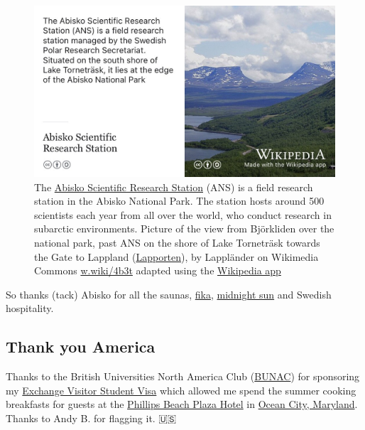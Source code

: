 \documentclass[
]{book}
\begin{document}
\begin{figure}

{\centering \includegraphics[width=0.99\linewidth]{images/abisko} 

}

\caption{The \href{https://en.wikipedia.org/wiki/Abisko_Scientific_Research_Station}{Abisko Scientific Research Station} (ANS) is a field research station in the Abisko National Park. The station hosts around 500 scientists each year from all over the world, who conduct research in subarctic environments. Picture of the view from Björkliden over the national park, past ANS on the shore of Lake Torneträsk towards the Gate to Lappland (\href{https://en.wikipedia.org/wiki/Lapporten}{Lapporten}), by Lappländer on Wikimedia Commons \href{https://w.wiki/4b3t}{w.wiki/4b3t} adapted using the \href{https://apps.apple.com/us/app/wikipedia/id324715238}{Wikipedia app}}\label{fig:abisko-fig}
\end{figure}



So thanks (tack) Abisko for all the saunas, \href{https://www.swedishfood.com/fika}{fika}, \href{https://en.wikipedia.org/wiki/Midnight_sun}{midnight sun} and Swedish hospitality. 🙏

\hypertarget{usa}{%
\subsection{Thank you America}\label{usa}}

Thanks to the British Universities North America Club (\href{https://en.wikipedia.org/wiki/BUNAC}{BUNAC}) for sponsoring my \href{https://travel.state.gov/content/travel/en/us-visas/study/exchange.html}{Exchange Visitor Student Visa} which allowed me spend the summer cooking breakfasts for guests at the \href{https://www.oceancity.com/end-of-an-era-beach-plaza-hotel-closing-permanently/}{Phillips Beach Plaza Hotel} in \href{https://en.wikipedia.org/wiki/Ocean_City,_Maryland}{Ocean City, Maryland}. Thanks to Andy B. for flagging it. 🇺🇸
\end{document}
